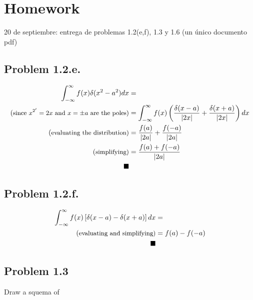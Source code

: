 \documentclass[../main/main.tex]{subfiles}
\begin{document}
\section{Homework}

20 de septiembre: entrega de problemas 1.2(e,f), 1.3 y 1.6 (un único documento pdf)
\subsection*{Problem 1.2.e.}

\begin{align*}
	\int _{-\infty}^{\infty}f(x) \delta (x^{2} - a^{2}) d x & =                                                                                                    \\
	\textrm{(\small since $x^{2'} = 2x$ and $x=\pm a$ are the poles)}
	                                                        & = \int _{-\infty}^{\infty}f(x)\left( \frac{\delta (x-a)}{|2x|} + \frac{\delta(x+a)}{|2x|}\right) d x \\
	\textrm{(\small evaluating the distribution)}
	                                                        & =\frac{f(a)}{|2a|} + \frac{f(-a)}{|2a|}                                                              \\
	\textrm{(\small simplifying)}
	                                                        & = \frac{f(a) + f(-a)}{|2a|}                                                                          \\ \qed
\end{align*}

\subsection*{Problem 1.2.f.}

\begin{align*}
	\int _{-\infty}^{\infty}f(x) \left[\delta(x-a) - \delta(x+a)\right]d x & =             \\
	\textrm{(\small evaluating and simplifying)}
	                                                                       & =f(a) - f(-a) \\
	\qed
\end{align*}

\pagebreak
\subsection*{Problem 1.3}

Draw a squema of
\end{document}
